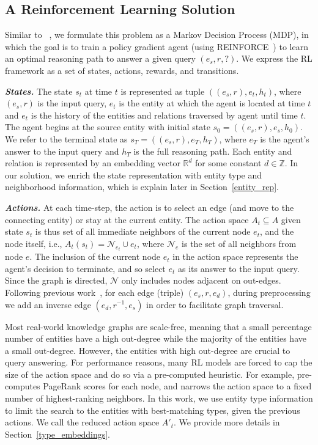 \subsection{A Reinforcement Learning Solution} \label{sec:problem}
Similar to ~\cite{das2017go,lin2018multi,xiong2017deeppath}, we formulate this problem as a Markov Decision Process (MDP), in which the goal is to train a policy gradient agent (using REINFORCE~\cite{williams1992simple}) to learn an optimal reasoning path to answer a given query $(e_s,r,?)$. We express the RL framework as a set of states, actions, rewards, and transitions.

\textit{\textbf{States.}}
The state $s_t$ at time $t$ is represented as tuple $((e_s,r),e_t,h_t)$, where $(e_s, r)$ is the input query, $e_t$ is the entity at which the agent is located at time $t$ and $e_t$ is the history of the entities and relations traversed by agent until time $t$. The agent begins at the source entity with initial state $s_0 = ((e_s, r), e_s,h_0)$. We refer to the terminal state as $s_T = ((e_s, r), e_T,h_T)$, where $e_T$ is the agent's answer to the input query and $h_T$ is the full reasoning path. Each entity and relation is represented by an embedding vector $\mathbb{R}^d$ for some constant $d \in \mathbb{Z}$. In our solution, we enrich the state representation with entity type and neighborhood information, which is explain later in Section~\ref{entity_rep}.

\textit{\textbf{Actions.}}
At each time-step, the action is to select an edge (and move to the connecting entity) or stay at the current entity. The action space $A_t \subseteq A$ given state $s_t$ is thus set of all immediate neighbors of the current node $e_t$, and the node itself, i.e., $A_t(s_t) = \mathcal{N}_{e_t} \cup {e_t}$, where $\mathcal{N}_e$ is the set of all neighbors from node $e$. The inclusion of the current node $e_t$ in the action space represents the agent's decision to terminate, and so select $e_t$ as its answer to the input query. Since the graph is directed, $\mathcal{N}$ only includes nodes adjacent on out-edges. Following previous work~\cite{bordes2013translating,das2017go,xiong2017deeppath}, for each edge (triple) $(e_s,r,e_d)$, during preprocessing we add an inverse edge $(e_d,r^{-1},e_s)$ in order to facilitate graph traversal.

Most real-world knowledge graphs are scale-free, meaning that a small percentage number of entities have a high out-degree while the majority of the entities have a small out-degree. However, the entities with high out-degree are crucial to query answering. For performance reasons, many RL models are forced to cap the size of the action space and do so via a pre-computed heuristic. For example, \cite{lin2018multi} pre-computes PageRank scores for each node, and narrows the action space to a fixed number of highest-ranking neighbors. In this work, we use entity type information to limit the search to the entities with best-matching types, given the previous actions. We call the reduced action space $A'_t$. We provide more details in Section~\ref{type_embeddings}.

